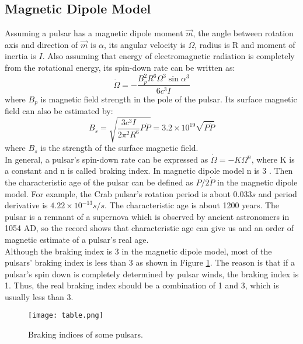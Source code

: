 \documentclass[12pt]{report}
\begin{document}
    \subsection{Magnetic Dipole Model}
      Assuming a pulsar has a magnetic dipole moment $\vec{m}$, the angle between rotation axis and 
      direction of 
      $\vec{m}$ is $\alpha$, its angular velocity is $\Omega$, radius is R and moment of inertia is $I$. 
      Also assuming that energy of electromagnetic radiation is completely from the rotational energy, 
      its spin-down rate can be written as: 
      $$
          \dot{\Omega}=-\frac{B_p^2 R^6 \Omega^3 \sin{\alpha}^3}{6c^3I}
      $$
      where $B_p$ is magnetic field strength in the pole of the pulsar. Its surface magnetic field can 
      also be estimated by:
      $$
          B_s=\sqrt{\frac{3c^3I}{2\pi^2R^6}P\dot{P}}=3.2\times 10^{19}\sqrt{P\dot{P}}
      $$
      where $B_s$ is the strength of the surface magnetic field. \\
      \indent In general, a pulsar's spin-down rate can be expressed as $\dot{\Omega}=-K\Omega^{n}$, 
      where K is a constant and n is called braking index. In magnetic dipole model n is 
      3 \citep{Tong2015}. Then the characteristic age of the pulsar can be 
      defined as $P/2\dot{P}$ in the magnetic dipole model. For example, the Crab 
      pulsar's rotation period is about $0.033s$ and period derivative is 
      $4.22\times 10^{-13}s/s$. The characteristic age is about 1200 years. The pulsar 
      is a remnant of a supernova which is observed by ancient astronomers in 1054 
      AD, so the record shows that characteristic age can give us and an order of magnetic 
      estimate of a pulsar's real age. \\
      \indent 
      Although the braking index is 3 in the magnetic dipole model, most of the pulsars' 
      braking index is less than 3 as shown in Figure \ref{fig:braking_index}. The reason is 
      that if a pulsar's spin down is completely determined by pulsar winds, the braking 
      index is 1. Thus, the real braking index should be a combination of 1 and 3, which is usually 
      less than 3. \citep{PhysRevD.91.063007}
        
      \begin{figure}[!ht]
        \centering
        \texttt{[image: table.png]}
        \caption{Braking indices of some pulsars.}
        \label{fig:braking_index}
      \end{figure}
  
\end{document}
